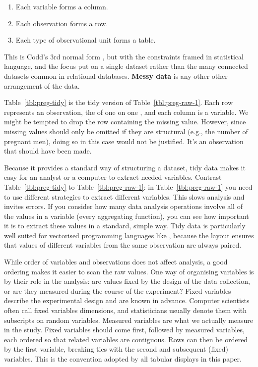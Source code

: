 \documentclass[article]{jss}
\begin{document}
\begin{enumerate}
  \item Each variable forms a column.
  \item Each observation forms a row.
  \item Each type of observational unit forms a table.
\end{enumerate}

\noindent This is Codd's 3rd normal form \citep{codd:1990}, but with the constraints framed in statistical language, and the focus put on a single dataset rather than the many connected datasets common in relational databases. \textbf{Messy data} is any other other arrangement of the data. 

Table~\ref{tbl:preg-tidy} is the tidy version of Table~\ref{tbl:preg-raw-1}. Each row represents an observation, the  of one  on one , and each column is a variable. We might be tempted to drop the row containing the missing value. However, since missing values should only be omitted if they are structural (e.g., the number of pregnant men), doing so in this case would not be justified. It's an observation that should have been made.

Because it provides a standard way of structuring a dataset, tidy data makes it easy for an analyst or a computer to extract needed variables. Contrast Table~\ref{tbl:preg-tidy} to Table~\ref{tbl:preg-raw-1}: in Table~\ref{tbl:preg-raw-1} you need to use different strategies to extract different variables. This slows analysis and invites errors. If you consider how many data analysis operations involve all of the values in a variable (every aggregating function), you can see how important it is to extract these values in a standard, simple way. Tidy data is particularly well suited for vectorised programming languages like , because the layout ensures that values of different variables from the same observation are always paired.

While order of variables and observations does not affect analysis, a good ordering makes it easier to scan the raw values. One way of organising variables is by their role in the analysis: are values fixed by the design of the data collection, or are they measured during the course of the experiment? Fixed variables describe the experimental design and are known in advance. Computer scientists often call fixed variables dimensions, and statisticians usually denote them with subscripts on random variables. Measured variables are what we actually measure in the study. Fixed variables should come first, followed by measured variables, each ordered so that related variables are contiguous. Rows can then be ordered by the first variable, breaking ties with the second and subsequent (fixed) variables. This is the convention adopted by all tabular displays in this paper. 
\end{document}
